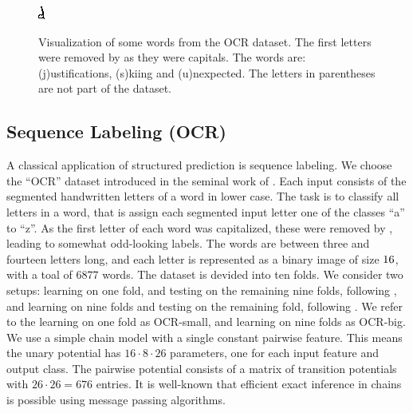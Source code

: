 \begin{figure}
    \includegraphics[width=.068\linewidth, frame]{evaluation/images/unexpected_08}\\
    \caption{%
        Visualization of some words from the OCR dataset. The first letters were removed by \citet{taskar2003max} as 
        they were capitals.
        The words are: (j)ustifications, (s)kiing and (u)nexpected. The letters in parentheses are not part of the dataset.
    }
\end{figure}
\subsection{Sequence Labeling (OCR)}
A classical application of structured prediction is sequence labeling.
We choose the ``OCR'' dataset introduced in the seminal work of \citet{taskar2003max}.
Each input consists of the segmented handwritten letters of a word in lower
case. The task is to classify all letters in a word, that is assign each
segmented input letter one of the classes ``a'' to ``z''. As the first letter
of each word was capitalized, these were removed by \citet{taskar2003max},
leading to somewhat odd-looking labels. The words are between three and fourteen
letters long, and each letter is represented as a binary image of size $16
\time 8$, with a toal of $6877$ words.
The dataset is devided into ten folds. We consider two setups: learning
on one fold, and testing on the remaining nine folds, following \citet{taskar2003max},
and learning on nine folds and testing on the remaining fold, following \citet{lacoste}.
We refer to the learning on one fold as OCR-small, and learning on nine folds as OCR-big.
We use a simple chain model with a single constant pairwise feature.
This means the unary potential has $16 \cdot 8 \cdot 26$ parameters, one for each input
feature and output class. The pairwise potential consists of a matrix of
transition potentials with $26 \cdot 26=676$ entries.
It is well-known that efficient exact inference in chains is possible using
message passing algorithms. 


